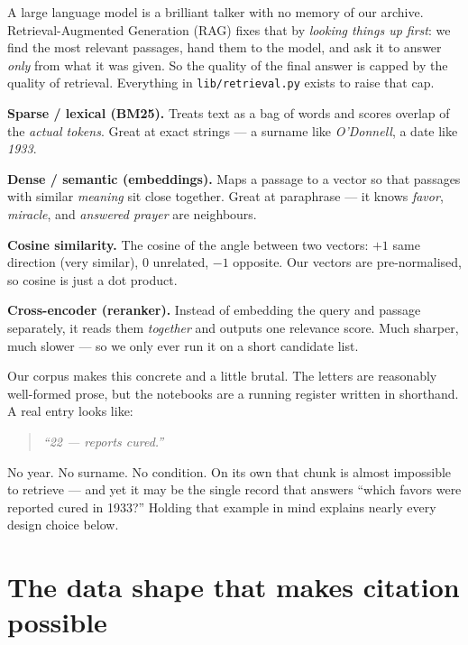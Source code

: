 \documentclass[11pt]{article}
\newcommand{\file}[1]{\texttt{#1}}
\begin{document}
A large language model is a brilliant talker with no memory of our archive. Retrieval-Augmented
Generation (RAG) fixes that by \emph{looking things up first}: we find the most relevant passages,
hand them to the model, and ask it to answer \emph{only} from what it was given. So the quality of
the final answer is capped by the quality of retrieval. Everything in \file{lib/retrieval.py} exists
to raise that cap.

\begin{primerbox}
\textbf{Sparse / lexical (BM25).} Treats text as a bag of words and scores overlap of the
\emph{actual tokens}. Great at exact strings --- a surname like \emph{O'Donnell}, a date like
\emph{1933}.

\textbf{Dense / semantic (embeddings).} Maps a passage to a vector so that passages with similar
\emph{meaning} sit close together. Great at paraphrase --- it knows \emph{favor}, \emph{miracle},
and \emph{answered prayer} are neighbours.

\textbf{Cosine similarity.} The cosine of the angle between two vectors: $+1$ same direction
(very similar), $0$ unrelated, $-1$ opposite. Our vectors are pre-normalised, so cosine is just a
dot product.

\textbf{Cross-encoder (reranker).} Instead of embedding the query and passage separately, it reads
them \emph{together} and outputs one relevance score. Much sharper, much slower --- so we only ever
run it on a short candidate list.
\end{primerbox}

Our corpus makes this concrete and a little brutal. The letters are reasonably well-formed prose,
but the notebooks are a running register written in shorthand. A real entry looks like:
\begin{quote}\small\itshape
``22 --- reports cured.''
\end{quote}
No year. No surname. No condition. On its own that chunk is almost impossible to retrieve --- and
yet it may be the single record that answers ``which favors were reported cured in 1933?'' Holding
that example in mind explains nearly every design choice below.

\section{The data shape that makes citation possible}
\end{document}
